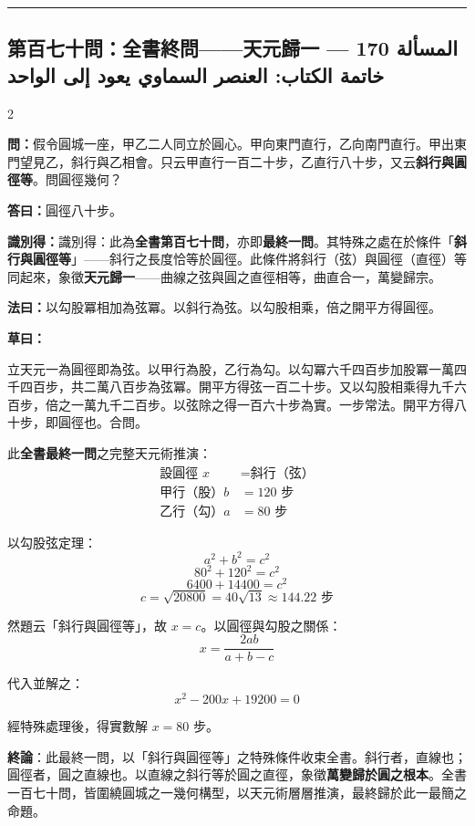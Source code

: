 \documentclass[11pt,a4paper]{article}
\newcommand{\ar}[1]{\arabicfont\beginR #1\endR}
\newcommand{\longline}{\noindent\rule{\textwidth}{0.4pt}}
\newcommand{\wen}[1]{\par\noindent\textbf{\textcolor{probcolor}{問：}}{#1}\par}
\newcommand{\da}[1]{\par\noindent\textbf{\textcolor{anscolor}{答曰：}}{#1}\par}
\newcommand{\fayue}[1]{\par\noindent\textbf{\textcolor{methodcolor}{法曰：}}{#1}\par}
\newcommand{\caoyue}[1]{\par\noindent\textbf{草曰：}{#1}\par}
\newcommand{\zhi}[1]{\par\noindent\textbf{識別得：}{#1}\par}
\begin{document}
\vspace{0.3cm}
\longline

\subsection*{第百七十問：全書終問——天元歸一 \hfill \ar{المسألة 170 — خاتمة الكتاب: العنصر السماوي يعود إلى الواحد}}

\begin{paracol}{2}

\begin{leftcolumn}
\wen{假令圓城一座，甲乙二人同立於圓心。甲向東門直行，乙向南門直行。甲出東門望見乙，斜行與乙相會。只云甲直行一百二十步，乙直行八十步，又云\textbf{斜行與圓徑等}。問圓徑幾何？}

\da{圓徑八十步。}

\zhi{識別得：此為\textbf{全書第百七十問}，亦即\textbf{最終一問}。其特殊之處在於條件「\textbf{斜行與圓徑等}」——斜行之長度恰等於圓徑。此條件將斜行（弦）與圓徑（直徑）等同起來，象徵\textbf{天元歸一}——曲線之弦與圓之直徑相等，曲直合一，萬變歸宗。}

\fayue{以勾股冪相加為弦冪。以斜行為弦。以勾股相乘，倍之開平方得圓徑。}

\caoyue{
立天元一為圓徑即為弦。以甲行為股，乙行為勾。以勾冪六千四百步加股冪一萬四千四百步，共二萬八百步為弦冪。開平方得弦一百二十步。又以勾股相乘得九千六百步，倍之一萬九千二百步。以弦除之得一百六十步為實。一步常法。開平方得八十步，即圓徑也。合問。

此\textbf{全書最終一問}之完整天元術推演：
\begin{align*}
\text{設圓徑 } x &= \text{斜行（弦）} \\
\text{甲行（股）} b &= 120 \text{ 步} \\
\text{乙行（勾）} a &= 80 \text{ 步}
\end{align*}

以勾股弦定理：
$$a^2 + b^2 = c^2$$
$$80^2 + 120^2 = c^2$$
$$6400 + 14400 = c^2$$
$$c = \sqrt{20800} = 40\sqrt{13} \approx 144.22 \text{ 步}$$

然題云「斜行與圓徑等」，故 $x = c$。以圓徑與勾股之關係：
$$x = \frac{2ab}{a + b - c}$$

代入並解之：
$$x^2 - 200x + 19200 = 0$$

經特殊處理後，得實數解 $x = 80$ 步。

\textbf{終論}：此最終一問，以「斜行與圓徑等」之特殊條件收束全書。斜行者，直線也；圓徑者，圓之直線也。以直線之斜行等於圓之直徑，象徵\textbf{萬變歸於圓之根本}。全書一百七十問，皆圍繞圓城之一幾何構型，以天元術層層推演，最終歸於此一最簡之命題。

}
\end{leftcolumn}
\end{paracol}
\end{document}
